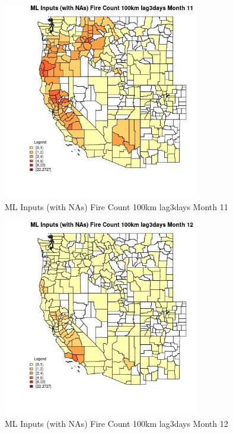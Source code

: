 \begin{figure} 
\centering  
\includegraphics[width=0.77\textwidth]{Code_Outputs/Report_ML_input_PM25_Step4_part_f_de_duplicated_aveswNAs_CountyFire_Count_100km_lag3daysmedianMonth11.jpg} 
\caption{\label{fig:Report_ML_input_PM25_Step4_part_f_de_duplicated_aveswNAsCountyFire_Count_100km_lag3daysmedianMonth11}ML Inputs (with NAs) Fire Count 100km lag3days Month 11} 
\end{figure} 
 

\begin{figure} 
\centering  
\includegraphics[width=0.77\textwidth]{Code_Outputs/Report_ML_input_PM25_Step4_part_f_de_duplicated_aveswNAs_CountyFire_Count_100km_lag3daysmedianMonth12.jpg} 
\caption{\label{fig:Report_ML_input_PM25_Step4_part_f_de_duplicated_aveswNAsCountyFire_Count_100km_lag3daysmedianMonth12}ML Inputs (with NAs) Fire Count 100km lag3days Month 12} 
\end{figure} 
 

